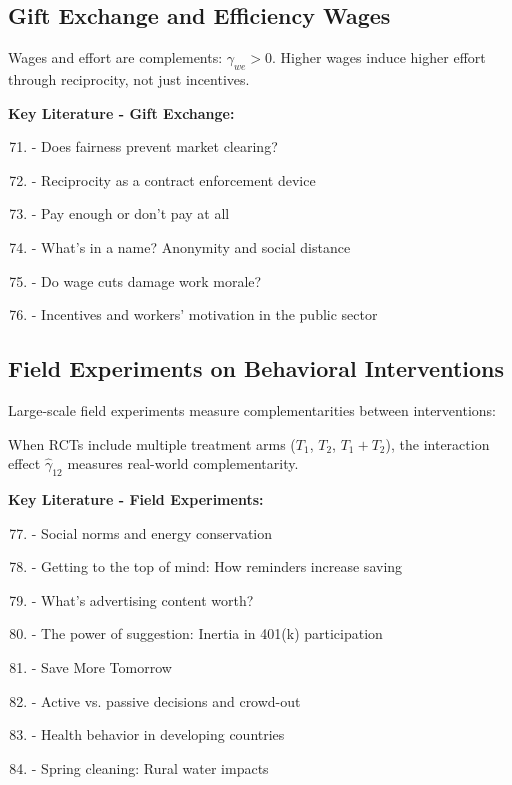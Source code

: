 \subsection{Gift Exchange and Efficiency Wages}
\label{subsec:gift-exchange}

\begin{finding}
Wages and effort are complements: $\gamma_{we} > 0$. Higher wages induce higher effort through reciprocity, not just incentives.
\end{finding}

\textbf{Key Literature - Gift Exchange:}
\begin{enumerate}[noitemsep]
    \setcounter{enumi}{70}
    \item \citet{fehr1993} - Does fairness prevent market clearing?
    \item \citet{fehr1997} - Reciprocity as a contract enforcement device
    \item \citet{gneezy2000} - Pay enough or don't pay at all
    \item \citet{charness2004} - What's in a name? Anonymity and social distance
    \item \citet{kube2012} - Do wage cuts damage work morale?
    \item \citet{delfgaauw2007} - Incentives and workers' motivation in the public sector
\end{enumerate}

\subsection{Field Experiments on Behavioral Interventions}
\label{subsec:field-experiments}

Large-scale field experiments measure complementarities between interventions:

\begin{finding}
When RCTs include multiple treatment arms ($T_1$, $T_2$, $T_1 + T_2$), the interaction effect $\hat{\gamma}_{12}$ measures real-world complementarity.
\end{finding}

\textbf{Key Literature - Field Experiments:}
\begin{enumerate}[noitemsep]
    \setcounter{enumi}{76}
    \item \citet{allcott2011} - Social norms and energy conservation
    \item \citet{karlan2011} - Getting to the top of mind: How reminders increase saving
    \item \citet{bertrand2010} - What's advertising content worth?
    \item \citet{madrian2001} - The power of suggestion: Inertia in 401(k) participation
    \item \citet{thaler2004} - Save More Tomorrow
    \item \citet{chetty2014} - Active vs. passive decisions and crowd-out
    \item \citet{dupas2011} - Health behavior in developing countries
    \item \citet{kremer2007} - Spring cleaning: Rural water impacts
\end{enumerate}

